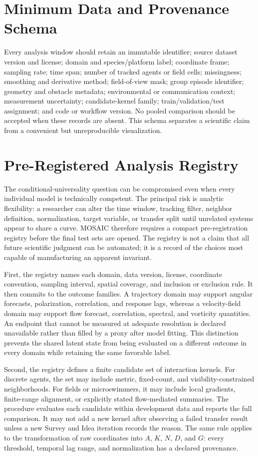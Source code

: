 \documentclass[conference]{../../../../Conference-LaTeX-template_10-17-19/IEEEtran}
\begin{document}
\appendices
\section{Minimum Data and Provenance Schema}
Every analysis window should retain an immutable identifier; source dataset version and license; domain and species/platform label; coordinate frame; sampling rate; time span; number of tracked agents or field cells; missingness; smoothing and derivative method; field-of-view mask; group episode identifier; geometry and obstacle metadata; environmental or communication context; measurement uncertainty; candidate-kernel family; train/validation/test assignment; and code or workflow version. No pooled comparison should be accepted when these records are absent. This schema separates a scientific claim from a convenient but unreproducible visualization.

\section{Pre-Registered Analysis Registry}
The conditional-universality question can be compromised even when every individual model is technically competent. The principal risk is analytic flexibility: a researcher can alter the time window, tracking filter, neighbor definition, normalization, target variable, or transfer split until unrelated systems appear to share a curve. MOSAIC therefore requires a compact pre-registration registry before the final test sets are opened. The registry is not a claim that all future scientific judgment can be automated; it is a record of the choices most capable of manufacturing an apparent invariant.

First, the registry names each domain, data version, license, coordinate convention, sampling interval, spatial coverage, and inclusion or exclusion rule. It then commits to the outcome families. A trajectory domain may support angular forecasts, polarization, correlation, and response lags, whereas a velocity-field domain may support flow forecast, correlation, spectral, and vorticity quantities. An endpoint that cannot be measured at adequate resolution is declared unavailable rather than filled by a proxy after model fitting. This distinction prevents the shared latent state from being evaluated on a different outcome in every domain while retaining the same favorable label.

Second, the registry defines a finite candidate set of interaction kernels. For discrete agents, the set may include metric, fixed-count, and visibility-constrained neighborhoods. For fields or microswimmers, it may include local gradients, finite-range alignment, or explicitly stated flow-mediated summaries. The procedure evaluates each candidate within development data and reports the full comparison. It may not add a new kernel after observing a failed transfer result unless a new Survey and Idea iteration records the reason. The same rule applies to the transformation of raw coordinates into $A$, $K$, $N$, $D$, and $G$: every threshold, temporal lag range, and normalization has a declared provenance.
\end{document}
